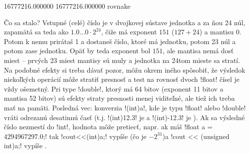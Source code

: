 \begin{outputBox}
16777216.000000
16777216.000000
rovnake
\end{outputBox}

Čo sa stalo? Vstupné (celé) číslo je v dvojkovej sústave jednotka a za ňou
24 núl, zapamätá sa teda ako $1.0\ldots0\cdot2^{24}$, čiže má
exponent $151$ ($127+24$)  a mantisu $0$. Potom k nemu prirátaš 1 a dostaneš
číslo, ktoré má jednotku, potom 23 núl a potom zase jednotku. Opäť by teda exponent
bol $151$, ale mantisa nemá dosť miest -- prvých 23 miest mantisy sú muly a jednotka
na 24tom mieste sa stratí. Na podobné efekty si treba dávať pozor, môžu okrem iného
spôsobiť, že výsledok niekoľkých operácií môže stratiť presnosť a test na rovnosť
dvoch \prg!float! čísel je vždy ošemetný. Pri type \prg!double!, ktorý má 64 bitov
(exponent 11 bitov a mantisa 52 bitov) sú efekty straty presnosti menej viditeľné,
ale tiež ich treba  mať na pamäti. Posledná vec: konverzia \prg!(int)a!, kde 
je typu \prg!float! alebo \prg!double! vráti odrezanú desatinnú časť (t.j.
\prg!(int)12.3! je  a \prg!(int)-12.3! je ). Ak sa výsledné číslo
nezmestí do \prg!int!, hodnota môže pretiecť, napr. ak máš
\prg!float a = 4294967297.0;! tak \prg!cout<<(int)a;! vypíše  (čo je
$-2^{31}$)a \prg!cout << (unsigned int)a;! vypíše .

